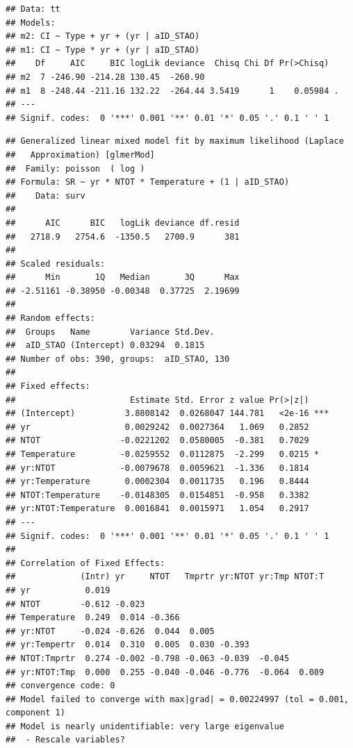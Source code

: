 \documentclass[fleqn,10pt,lineno]{wlpeerj} %
\theoremstyle{definition}
\theoremstyle{definition}
\theoremstyle{definition}
\theoremstyle{remark}
\begin{document}
\begin{verbatim}
## Data: tt
## Models:
## m2: CI ~ Type + yr + (yr | aID_STAO)
## m1: CI ~ Type * yr + (yr | aID_STAO)
##    Df     AIC     BIC logLik deviance  Chisq Chi Df Pr(>Chisq)  
## m2  7 -246.90 -214.28 130.45  -260.90                           
## m1  8 -248.44 -211.16 132.22  -264.44 3.5419      1    0.05984 .
## ---
## Signif. codes:  0 '***' 0.001 '**' 0.01 '*' 0.05 '.' 0.1 ' ' 1
\end{verbatim}

\begin{verbatim}
## Generalized linear mixed model fit by maximum likelihood (Laplace
##   Approximation) [glmerMod]
##  Family: poisson  ( log )
## Formula: SR ~ yr * NTOT * Temperature + (1 | aID_STAO)
##    Data: surv
## 
##      AIC      BIC   logLik deviance df.resid 
##   2718.9   2754.6  -1350.5   2700.9      381 
## 
## Scaled residuals: 
##      Min       1Q   Median       3Q      Max 
## -2.51161 -0.38950 -0.00348  0.37725  2.19699 
## 
## Random effects:
##  Groups   Name        Variance Std.Dev.
##  aID_STAO (Intercept) 0.03294  0.1815  
## Number of obs: 390, groups:  aID_STAO, 130
## 
## Fixed effects:
##                       Estimate Std. Error z value Pr(>|z|)    
## (Intercept)          3.8808142  0.0268047 144.781   <2e-16 ***
## yr                   0.0029242  0.0027364   1.069   0.2852    
## NTOT                -0.0221202  0.0580005  -0.381   0.7029    
## Temperature         -0.0259552  0.0112875  -2.299   0.0215 *  
## yr:NTOT             -0.0079678  0.0059621  -1.336   0.1814    
## yr:Temperature       0.0002304  0.0011735   0.196   0.8444    
## NTOT:Temperature    -0.0148305  0.0154851  -0.958   0.3382    
## yr:NTOT:Temperature  0.0016841  0.0015971   1.054   0.2917    
## ---
## Signif. codes:  0 '***' 0.001 '**' 0.01 '*' 0.05 '.' 0.1 ' ' 1
## 
## Correlation of Fixed Effects:
##             (Intr) yr     NTOT   Tmprtr yr:NTOT yr:Tmp NTOT:T
## yr           0.019                                           
## NTOT        -0.612 -0.023                                    
## Temperature  0.249  0.014 -0.366                             
## yr:NTOT     -0.024 -0.626  0.044  0.005                      
## yr:Tempertr  0.014  0.310  0.005  0.030 -0.393               
## NTOT:Tmprtr  0.274 -0.002 -0.798 -0.063 -0.039  -0.045       
## yr:NTOT:Tmp  0.000  0.255 -0.040 -0.046 -0.776  -0.064  0.089
## convergence code: 0
## Model failed to converge with max|grad| = 0.00224997 (tol = 0.001, component 1)
## Model is nearly unidentifiable: very large eigenvalue
##  - Rescale variables?
\end{verbatim}
\end{document}
